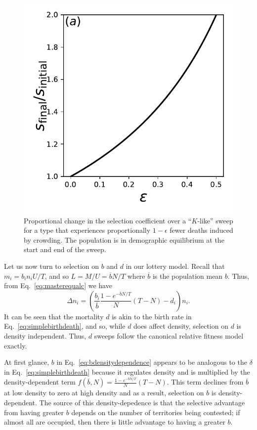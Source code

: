 \documentclass[12pt]{article}
\begin{document}
\begin{figure}
\centering
\includegraphics[scale=0.8]{strengthofselection.pdf}
\caption{\label{fig:strengthofselection} Proportional change in the selection coefficient over a ``$K$-like'' sweep for a type that experiences proportionally $1-\epsilon$ fewer deaths induced by crowding. The population is in demographic equilibrium at the start and end of the sweep.}
\end{figure}

Let us now turn to selection on $b$ and $d$ in our lottery model. Recall that $m_i=b_i n_i U/T$, and so $L=M/U=\overline{b}N/T$ where $\overline{b}$ is the population mean $b$. Thus, from Eq.~\eqref{eq:masterequalc} we have
\begin{equation}
\Delta n_i = \left(\frac{b_i}{\overline{b}}\frac{1-e^{-\overline{b}N/T}}{N}(T-N)-d_i\right)n_i. \label{eq:bdensitydependence}
\end{equation}
It can be seen that the mortality $d$ is akin to the birth rate in Eq.~\eqref{eq:simplebirthdeath}, and so, while $d$ does affect density, selection on $d$ is density independent. Thus, $d$ sweeps follow the canonical relative fitness model exactly.

At first glance, $b$ in Eq.~\eqref{eq:bdensitydependence} appears to be analogous to the $\delta$ in Eq.~\eqref{eq:simplebirthdeath} because it regulates density and is multiplied by the density-dependent term $f(\overline{b},N)=\frac{1-e^{-\overline{b}N/T}}{N}(T-N)$. This term declines from $\overline{b}$ at low density to zero at high density and as a result, selection on $b$ is density-dependent. The source of this density-depedence is that the selective advantage from having greater $b$ depends on the number of territories being contested; if almost all are occupied, then there is little advantage to having a greater $b$.
\end{document}

